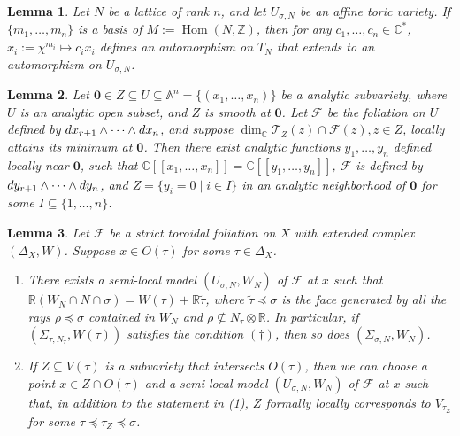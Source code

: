 \documentclass[10pt,a4paper]{amsart}
\newtheorem{lemma}{Lemma}
\newcommand\bA{{\mathbb A}}
\newcommand\bC{{\mathbb C}}
\newcommand\bR{{\mathbb R}}
\newcommand\bZ{{\mathbb Z}}
\newcommand\cF{{\mathcal{F}}}
\newcommand\cT{{\mathcal{T}}}
\newcommand{\diff}{\textnormal{d}}
\newcommand{\on}{\operatorname}
\begin{document}
\begin{lemma}\label{lem:local_isomorphism_of_affine_toric_variety}
    Let $N$ be a lattice of rank $n$, and let $U_{\sigma,N}$ be an affine toric variety. 
    If $\{m_1,\ldots,m_n\}$ is a basis of $M:=\on{Hom}(N,\bZ)$, then for any $c_1,\ldots,c_n\in\bC^*$, $x_i:=\chi^{m_i}\mapsto c_i x_i$ defines an automorphism on $T_N$ that extends to an automorphism on $U_{\sigma,N}$. 
\end{lemma}

\begin{lemma}\label{lem:minimal_intersection}
    Let $\mathbf 0\in Z\subseteq U\subseteq\bA^n=\{(x_1,\ldots,x_n)\}$ be a analytic subvariety, where $U$ is an analytic open subset, and $Z$ is smooth at $\mathbf 0$. Let $\cF$ be the foliation on $U$ defined by $\diff x_{r+1}\wedge\cdots\wedge\diff x_n$, and suppose
    $\dim_\bC \cT_{Z}(z)\cap\cF(z), z\in Z$, locally attains its minimum at $\mathbf 0$. Then there exist analytic functions $y_1,\ldots,y_n$ defined locally near $\mathbf 0$, such that $\bC[\![x_1,\ldots,x_n]\!]=\bC[\![y_1,\ldots,y_n]\!]$, $\cF$ is defined by $\diff y_{r+1}\wedge\cdots\wedge\diff y_n$, and $Z=\{y_i=0\mid i\in I\}$ in an analytic neighborhood of $\mathbf 0$ for some $I\subseteq\{1,\ldots,n\}$.
\end{lemma}

\begin{lemma}\label{lem:exist_semi_local_model}
    Let $\cF$ be a strict toroidal foliation on $X$ with extended complex $(\Delta_X,W)$. Suppose $x\in O(\tau)$ for some $\tau\in\Delta_X$.
    \begin{enumerate}
        \item There exists a semi-local model $(U_{\sigma,N},W_N)$ of $\cF$ at $x$ such that $\bR(W_{N}\cap N\cap \sigma)=W(\tau)+\bR\tilde\tau$, where $\tilde\tau\preceq\sigma$ is the face generated by all the rays $\rho\preceq\sigma$ contained in $W_N$ and $\rho\nsubseteq N_\tau\otimes\bR$. In particular, if $(\Sigma_{\tau,N_\tau}, W(\tau))$ satisfies the condition $(\dagger)$, then so does $(\Sigma_{\sigma,N},W_N)$.

        \item If $Z\subseteq V(\tau)$ is a subvariety that intersects $O(\tau)$, then we can choose a point $x\in Z\cap O(\tau)$ and a semi-local model $(U_{\sigma,N},W_N)$ of $\cF$ at $x$ such that, in addition to the statement in (1), $Z$ formally locally corresponds to $V_{\tau_Z}$ for some $\tau\preceq\tau_Z\preceq \sigma$.
    \end{enumerate}
\end{lemma}
\end{document}
